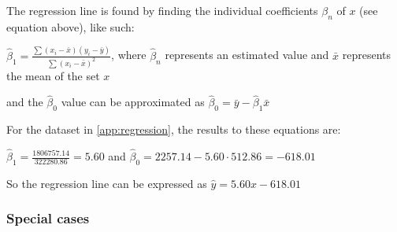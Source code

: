 \documentclass[11pt,letterpaper]{article}
\begin{document}
\begin{center}
\end{center}



The regression line is found by finding the individual coefficients $\beta_n$ of $x$ (see equation above), like such:

$\hat \beta_1 = \frac{\sum (x_i - \bar x) (y_i - \bar y)}{\sum (x_i - \bar x)^2}$, where $\hat \beta_n$ represents an estimated value and $\bar x$ represents the mean of the set $x$

and the $\hat \beta_0$ value can be approximated as $\hat \beta_0 = \bar y - \hat \beta_1 \bar x$

For the dataset in \ref{app:regression}, the results to these equations are:

$\hat \beta_1 = \frac{1806757.14}{322280.86} = 5.60$ and $\hat \beta_0 = 2257.14 - 5.60 \cdot 512.86 = -618.01$

So the regression line can be expressed as $\boxed{ \hat y = 5.60 x -618.01}$

\subsubsection{Special cases}
\end{document}
